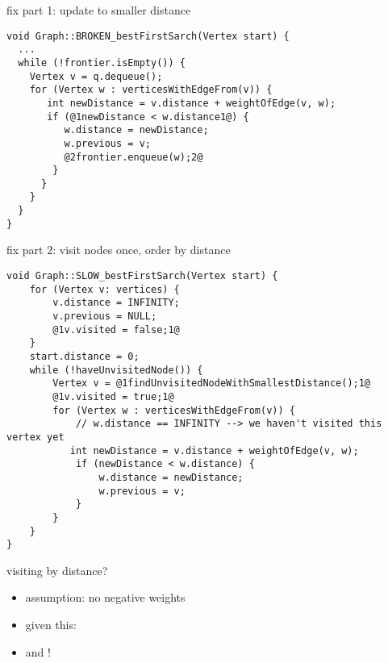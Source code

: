 \begin{frame}[fragile,label=fixPartOne]{fix part 1: update to smaller distance}
\begin{lstlisting}
void Graph::BROKEN_bestFirstSarch(Vertex start) {
  ... 
  while (!frontier.isEmpty()) {
    Vertex v = q.dequeue();
    for (Vertex w : verticesWithEdgeFrom(v)) {
       int newDistance = v.distance + weightOfEdge(v, w);
       if (@1newDistance < w.distance1@) {
          w.distance = newDistance;
          w.previous = v;
          @2frontier.enqueue(w);2@
        } 
      }
    }
  }
}
\end{lstlisting}
\end{frame}

\begin{frame}[fragile,label=withDistance]{fix part 2: visit nodes once, order by distance}
\begin{lstlisting}
void Graph::SLOW_bestFirstSarch(Vertex start) {
    for (Vertex v: vertices) {
        v.distance = INFINITY;
        v.previous = NULL;
        @1v.visited = false;1@
    }
    start.distance = 0;
    while (!haveUnvisitedNode()) {
        Vertex v = @1findUnvisitedNodeWithSmallestDistance();1@
        @1v.visited = true;1@
        for (Vertex w : verticesWithEdgeFrom(v)) {
            // w.distance == INFINITY --> we haven't visited this vertex yet
           int newDistance = v.distance + weightOfEdge(v, w);
            if (newDistance < w.distance) {
                w.distance = newDistance;
                w.previous = v;
            } 
        }
    }
}
\end{lstlisting}
\end{frame}

\begin{frame}{visiting by distance?}
\begin{itemize}
\item assumption: no negative weights
\item given this: 
\item and !
\end{itemize}
\end{frame}

